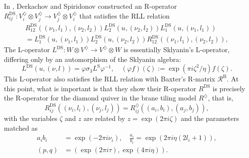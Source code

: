 In \cite{Derkachov:2012iv}, Derkachov and Spiridonov constructed
an R-operator $R_{ij}^{\mathrm{DS}}:V_{i}^{\diamondsuit}\otimes V_{j}^{\diamondsuit}\rightarrow V_{j}^{\diamondsuit}\otimes V_{i}^{\diamondsuit}$
that satisfies the RLL relation
\begin{multline}
    R_{12}^{\mathrm{DS}}\left(\left(\nu_{1},l_{1}\right),\left(\nu_{2},l_{2}\right)\right)
    L_{2}^{\mathrm{DS}}\left(u,\left(\nu_{2},l_{2}\right)\right)
    L_{1}^{\mathrm{DS}}\left(u,\left(\nu_{1},l_{1}\right)\right)    \\
      =
        L_{1}^{\mathrm{DS}}\left(u,\left(\nu_{1},l_{1}\right)\right)
        L_{2}^{\mathrm{DS}}\left(u,\left(\nu_{2},l_{2}\right)\right)
        R_{12}^{\mathrm{DS}}\left(\left(\nu_{1},l_{1}\right),\left(\nu_{2},l_{2}\right)\right),
\end{multline}
 The L-operator $L^{\mathrm{DS}}:W\otimes V^{\diamondsuit}\rightarrow V^{\diamondsuit}\otimes W$
is essentially Sklyanin's L-operator, differing only by an automorphism
of the Sklyanin algebra:
\begin{equation}
    L^{\mathrm{DS}}\left(u,\left(\nu,l\right)\right)  
      =  \varphi  \sigma_{3}  L^{\mathrm{S}}\varphi^{-1},  
        \quad  \left(\varphi f\right)(\zeta)  :=  \exp(\pi i\zeta^{2}/\eta)f(\zeta).
\end{equation}
This L-operator also satisfies the RLL relation with Baxter's R-matrix
$\mathcal{R}^{\mathrm{B}}$. At this point, what is important is that
they show their R-operator $R^{\mathrm{DS}}$ is precisely the R-operator
for the diamond quiver in the brane tiling model $R^{\diamondsuit}$,
that is, 
\begin{equation}
    R_{ij}^{\mathrm{DS}}\left(\left(\nu_{i},l_{i}\right),\left(\nu_{j},l_{j}\right)\right)  
      =  
        R_{ij}^{\diamondsuit}\left(\left(a_{i},b_{i}\right),\left(a_{j},b_{j}\right)\right),
\end{equation}
 with the variables $\zeta$ and $z$ are related by $z=\exp(2\pi i\zeta)$
and the parameters matched as
\begin{align}
    a_{i} b_{i}         &  =  \exp(-2\pi i\nu_{i}),  \quad  \frac{a_{i}}{b_{i}}  =  \exp(2\pi i\eta(2l_{i}+1)),  \\
\left( p,q \right) &  =  \left(\exp(2\pi i\tau),\exp(4\pi i\eta)\right).
\end{align}

